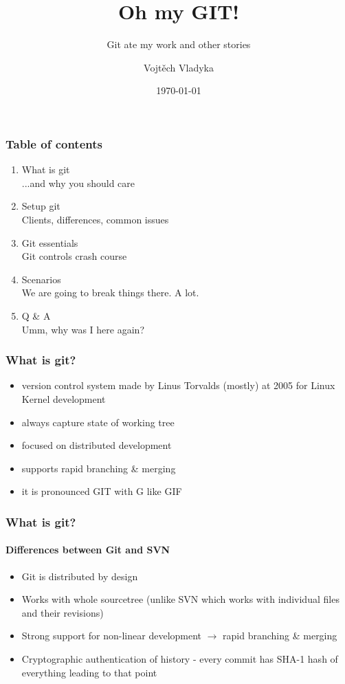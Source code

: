 \documentclass{beamer}
\title{Oh my GIT!}
\subtitle{Git ate my work and other stories}
\author{Vojtěch Vladyka}
\date{\today}
\begin{document}
    \frame{\titlepage}
    \begin{frame}
       \frametitle{Table of contents}
       \begin{enumerate}
           \item What is git
           \\   \textcolor{solarizedRebase01}{\footnotesize\hspace{1em} ...and why you should care}	
           \item Setup git
           \\   \textcolor{solarizedRebase01}{\footnotesize\hspace{1em} Clients, differences, common issues}	
           \item Git essentials
           \\   \textcolor{solarizedRebase01}{\footnotesize\hspace{1em} Git controls crash course}	
           \item Scenarios
           \\   \textcolor{solarizedRebase01}{\footnotesize\hspace{1em} We are going to break things there. A lot.}	
           \item Q \& A
           \\   \textcolor{solarizedRebase01}{\footnotesize\hspace{1em} Umm, why was I here again?}
       \end{enumerate}
    \end{frame}

    \begin{frame}
        \frametitle{What is git?}
        \begin{itemize}
            \item version control system made by Linus Torvalds (mostly) at 2005 for Linux Kernel development
            \item always capture state of working tree
            \item focused on distributed development
            \item supports rapid branching \& merging
            \item it is pronounced GIT with G like GIF ~
        \end{itemize}
    \end{frame}
    \begin{frame}
        \frametitle{What is git?}
        \framesubtitle{Differences between Git and SVN}
        \begin{itemize}
            \item Git is distributed by design
            \item Works with whole sourcetree (unlike SVN which works with individual files and their revisions)
            \item Strong support for non-linear development $\rightarrow$ rapid branching \& merging
            \item Cryptographic authentication of history - every commit has SHA-1 hash of everything leading to that point
        \end{itemize}
    \end{frame}
    
\end{document}
